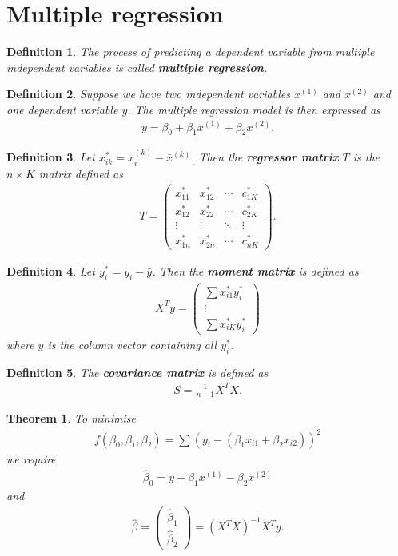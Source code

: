 \documentclass{article}
\theoremstyle{sltheorem}
\newtheorem{definition}{Definition}[section]
\newtheorem{theorem}{Theorem}[section]
\newcommand*\B[1]{\textbf{#1}}
\begin{document}
\section{Multiple regression}
\begin{definition}
	The process of predicting a dependent variable from multiple independent variables is called \B{multiple regression}.
\end{definition}
\begin{definition}
	Suppose we have two independent variables $x^{(1)}$ and $x^{(2)}$ and one dependent variable $y$.
	The multiple regression model is then expressed as
	\begin{align*}
		y = \beta_0 + \beta_1 x^{(1)} + \beta_2 x^{(2)}.
	\end{align*}
\end{definition}
\begin{definition}
	Let $x^*_{ik}=x^{(k)}_i - \bar x^{(k)}$. Then the \B{regressor matrix} $T$ is
	the $n\times K$ matrix defined as
	\begin{align*}
		T = \begin{pmatrix}
			x^*_{11} & x^*_{12} & \cdots & c^*_{1K}\\
			x^*_{12} & x^*_{22} & \cdots & c^*_{2K}\\
			\vdots & \vdots & \ddots & \vdots\\
			x^*_{1n} & x^*_{2n} &\cdots & c^*_{nK}
		\end{pmatrix}.
	\end{align*}
\end{definition}
\begin{definition}
	Let $y^*_i=y_i-\bar y$. Then the \B{moment matrix} is defined as
	\begin{align*}
		X^T y = \begin{pmatrix}
			\sum x^*_{i1} y^*_i\\
			\vdots\\
			\sum x^*_{iK} y^*_i
		\end{pmatrix}
	\end{align*}
	where $y$ is the column vector containing all $y^*_i$.	
\end{definition}
\begin{definition}
	The \B{covariance matrix} is defined as
	\begin{align*}
		S =\frac{1}{n-1}X^T X.
	\end{align*}
\end{definition}
\begin{theorem}
	To minimise
	\begin{align*}
		f(\beta_0, \beta_1, \beta_2) = \sum (y_i - (\beta_1 x_{i1}+\beta_2 x_{i2}))^2
	\end{align*}
	we require
	\begin{align*}
		\hat\beta_0 = \bar y - \beta_1\bar x^{(1)} - \beta_2\bar x^{(2)}
	\end{align*}
	and
	\begin{align*}
		\hat\beta = \begin{pmatrix}
			\hat\beta_1\\
			\hat\beta_2
		\end{pmatrix}
		= (X^T X)^{-1}X^T y.
	\end{align*}
\end{theorem}
\end{document}

